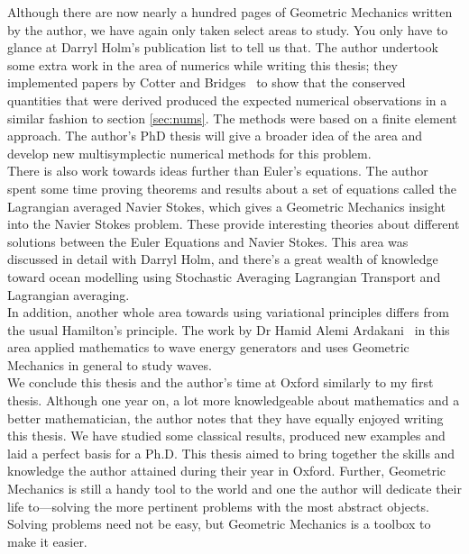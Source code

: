 \noindent
Although there are now nearly a hundred pages of Geometric Mechanics written by the author, we have again only taken select areas to study. You only have to glance at Darryl Holm's publication list to tell us that. The author undertook some extra work in the area of numerics while writing this thesis; they implemented papers by Cotter and Bridges~\cite{cotter2005general,hamil_pdes} to show that the conserved quantities that were derived produced the expected numerical observations in a similar fashion to section \ref{sec:nums}. The methods were based on a finite element approach. The author's PhD thesis will give a broader idea of the area and develop new multisymplectic numerical methods for this problem.\\


\noindent
There is also work towards ideas further than Euler's equations. The author spent some time proving theorems and results about a set of equations called the Lagrangian averaged Navier Stokes, which gives a Geometric Mechanics insight into the Navier Stokes problem. These provide interesting theories about different solutions between the Euler Equations and Navier Stokes. This area was discussed in detail with Darryl Holm, and there's a great wealth of knowledge toward ocean modelling using Stochastic Averaging Lagrangian Transport and Lagrangian averaging.\\

\noindent
In addition, another whole area towards using variational principles differs from the usual Hamilton's principle. The work by Dr Hamid Alemi Ardakani~\cite{hamid_sloshing,alemi_ardakani_2019} in this area applied mathematics to wave energy generators and uses Geometric Mechanics in general to study waves.\\

\noindent
We conclude this thesis and the author's time at Oxford similarly to my first thesis. Although one year on, a lot more knowledgeable about mathematics and a better mathematician, the author notes that they have equally enjoyed writing this thesis. We have studied some classical results, produced new examples and laid a perfect basis for a Ph.D. This thesis aimed to bring together the skills and knowledge the author attained during their year in Oxford. Further, Geometric Mechanics is still a handy tool to the world and one the author will dedicate their life to—solving the more pertinent problems with the most abstract objects. Solving problems need not be easy, but Geometric Mechanics is a toolbox to make it easier.